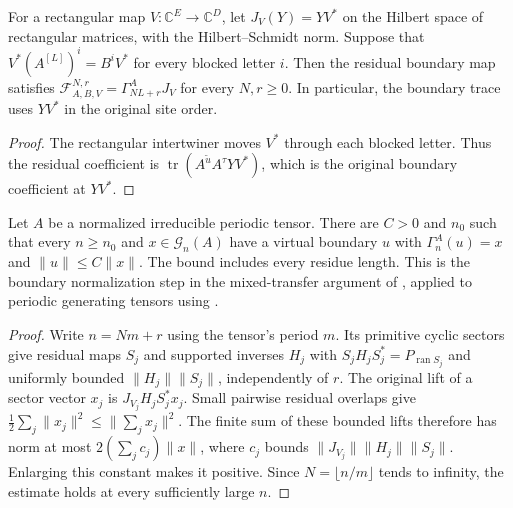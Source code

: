 \begin{definition}
    \label{def:residual_boundary_embedding}
    \leanok
    For a rectangular map $V:\mathbb C^E\to\mathbb C^D$, let
    $J_V(Y)=YV^*$ on the Hilbert space of rectangular matrices, with the
    Hilbert--Schmidt norm. Suppose that
    $V^*(A^{[L]})^i=B^iV^*$ for every blocked letter $i$.
    Then the residual boundary map satisfies
    $\mathcal F^{N,r}_{A,B,V}=\Gamma^A_{NL+r}J_V$ for every $N,r\geq0$.
    In particular, the boundary trace uses $YV^*$ in the original site order.
\end{definition}
\begin{proof}\leanok
    The rectangular intertwiner moves $V^*$ through each blocked letter.
    Thus the residual coefficient is
    $\operatorname{tr}(A^{\widetilde u}A^\tau YV^*)$, which is the original
    boundary coefficient at $YV^*$.
\end{proof}

\begin{lemma}
    \label{thm:periodic_boundary_uniform_lifts}
    \leanok
    Let $A$ be a normalized irreducible periodic tensor. There are $C>0$
    and $n_0$ such that every $n\geq n_0$ and $x\in\mathcal G_n(A)$ have
    a virtual boundary $u$ with $\Gamma^A_n(u)=x$ and
    $\|u\|\leq C\|x\|$. The bound includes every residue length.
    This is the boundary normalization step in the mixed-transfer argument
    of \cite[Lemma disjoint]{Nachtergaele1996Spectral}, applied to
    periodic generating tensors using
    \cite[Lemma~6]{DeLasCuevas2017Irreducible}.
\end{lemma}
\begin{proof}\leanok
    Write $n=Nm+r$ using the tensor's period $m$. Its primitive cyclic
    sectors give residual maps $S_j$ and supported inverses $H_j$ with
    $S_jH_jS_j^*=P_{\operatorname{ran}S_j}$ and uniformly bounded
    $\|H_j\|\|S_j\|$, independently of $r$.
    The original lift of a sector vector $x_j$ is $J_{V_j}H_jS_j^*x_j$.
    Small pairwise residual overlaps give
    $\tfrac12\sum_j\|x_j\|^2\leq\|\sum_jx_j\|^2$.
    The finite sum of these bounded lifts therefore has norm at most
    $2(\sum_jc_j)\|x\|$, where
    $c_j$ bounds $\|J_{V_j}\|\|H_j\|\|S_j\|$.
    Enlarging this constant makes it positive. Since $N=\lfloor n/m\rfloor$
    tends to infinity, the estimate holds at every sufficiently large $n$.
\end{proof}

